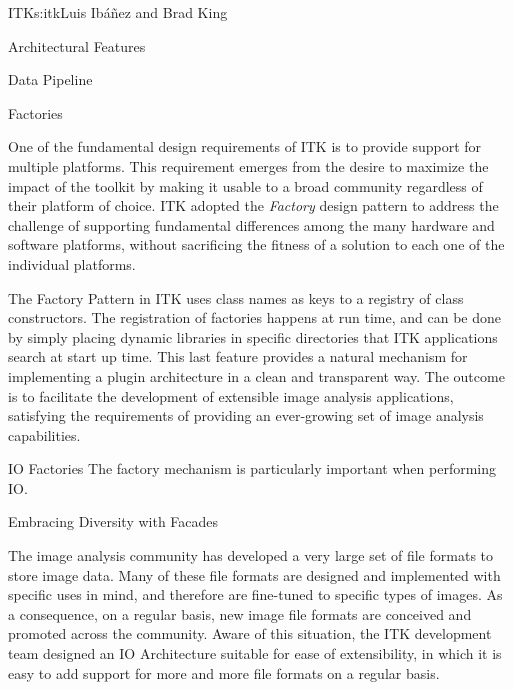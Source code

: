 \begin{aosachapter}{ITK}{s:itk}{Luis Ib\'{a}\~{n}ez and Brad King}
\begin{aosasect1}{Architectural Features}
\begin{aosasect2}{Data Pipeline}
\end{aosasect2}

\begin{aosasect2}{Factories}

One of the fundamental design requirements of ITK is to provide support for
multiple platforms. This requirement emerges from the desire to maximize the
impact of the toolkit by making it usable to a broad community regardless of
their platform of choice. ITK adopted the \emph{Factory} design pattern to
address the challenge of supporting fundamental differences among the many
hardware and software platforms, without sacrificing the fitness of a
solution to each one of the individual platforms.

The Factory Pattern in ITK uses class names as keys to a registry of class
constructors. The registration of factories happens at run time, and can be
done by simply placing dynamic libraries in specific directories that ITK
applications search at start up time. This last feature provides a natural
mechanism for implementing a plugin architecture in a clean and transparent
way. The outcome is to facilitate the development of extensible image analysis
applications, satisfying the requirements of providing an ever-growing set of
image analysis capabilities.

\end{aosasect2}

\begin{aosasect2}{IO Factories}
The factory mechanism is particularly important when performing IO.

\begin{aosasect3}{Embracing Diversity with Facades}

The image analysis community has developed a very large set of file formats to
store image data. Many of these file formats are designed and implemented with
specific uses in mind, and therefore are fine-tuned to specific types of
images. As a consequence, on a regular basis, new image file formats are
conceived and promoted across the community. Aware of this situation, the ITK
development team designed an IO Architecture suitable for ease of
extensibility, in which it is easy to add support for more and more file
formats on a regular basis.



\end{aosasect3}
\end{aosasect2}
\end{aosasect1}
\end{aosachapter}
